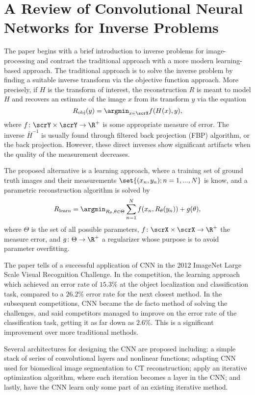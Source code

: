 \section{A Review of Convolutional Neural Networks for Inverse Problems}
The paper begins with a brief introduction to inverse problems for
image-processing and contrast the traditional approach with a more modern
learning-based approach. The traditional approach is to solve the inverse
problem by finding a suitable inverse transform via the objective function
approach. More precisely, if $H$ is the transform of interest, the
reconstruction $R$ is meant to model $H$ and recovers an estimate of the image
$x$ from its transform $y$ via the equation
\begin{equation}
  \label{eq:sum-2:obj-fun-app}
  R_{\text{obj}}(y)=\argmin_{x\in\scrX}f(H(x),y),
\end{equation}
where $f\colon\scrY\times\scrY\to\R^+$ is some appropriate measure of error. The
inverse $\bar H^{-1}$ is usually found through filtered back projection (FBP)
algorithm, or the back projection. However, these direct inverses show
significant artifacts when the quality of the measurement decreases.

The proposed alternative is a learning approach, where a training set of ground
truth images and their measurements $\set{(x_n,y_n);n=1,...,N}$ is know, and a
parametric reconstruction algorithm is solved by
\begin{equation}
  \label{eq:sum-2:param-rec-alg}
  R_{\text{learn}}=\argmin_{R_\theta,\theta\in\Theta}\sum_{n=1}^N f(x_n,R_\theta(y_n))+g(\theta),
\end{equation}
where $\Theta$ is the set of all possible parameters,
$f\colon\scrX\times\scrX\to\R^+$ the measure error, and $g\colon\Theta\to\R^+$ a
regularizer whose purpose is to avoid parameter overfitting.

The paper tells of a successful application of CNN in the 2012 ImageNet Large
Scale Visual Recognition Challenge. In the competition, the learning approach
which achieved an error rate of $15.3\%$ at the object localization and
classification task, compared to a $26.2\%$ error rate for the next closest
method. In the subsequent competitions, CNN became the de facto method of
solving the challenges, and said competitors managed to improve on the error
rate of the classification task, getting it as far down as $2.6\%$. This is a
significant improvement over more traditional methods.

Several architectures for designing the CNN are proposed including: a simple
stack of series of convolutional layers and nonlinear functions; adapting CNN
used for biomedical image segmentation to CT reconstruction; apply an iterative
optimization algorithm, where each iteration becomes a layer in the CNN; and
lastly, have the CNN learn only some part of an existing iterative method.

